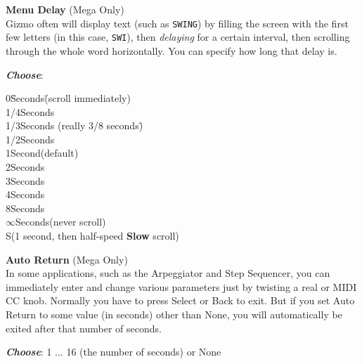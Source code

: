 \documentclass{article}
\begin{document}
\begin{description}
		
	\item{\bf  Menu Delay} (Mega Only)\\
		Gizmo often will display text (such as \texttt{SWING}) by filling the screen with the first few letters (in this case, \texttt{SWI}), then {\it delaying} for a certain interval, then scrolling through the whole word horizontally. You can specify how long that delay is.
	
		
		\begin{description}
			\item{\bf \textit{Choose}}:
			\begin{tabbing}
			0\hspace{2em}\=Seconds\hspace{0.5in}\=(scroll immediately)\\
			1/4\>Seconds\\
			1/3\>Seconds \>(really 3/8 seconds)\hspace{1in}\=\\
			1/2\>Seconds\\
			1\>Second\>(default)\\
			2\>Seconds\\
			3\>Seconds\\
			4\>Seconds\\
			8\>Seconds\\
			\(\infty\)\>Seconds\>(never scroll)\>\\
			S\>\>(1 second, then half-speed {\bf Slow} scroll)
			\end{tabbing}
		\end{description}

	\item{\bf  Auto Return} (Mega Only)\\
		In some applications, such as the Arpeggiator and Step Sequencer, you can immediately enter and change various parameters just by twisting a real or MIDI CC knob.  Normally you have to press Select or Back to exit.  But if you set Auto Return to some value (in seconds) other than None, you will automatically be exited after that number of seconds.

			\begin{description}
					\item{\bf \textit{Choose}}: 1 ... 16 (the number of seconds) or None\hspace{1.45in}\smash{\texttt{[image: none.pdf]}}
			\end{description}


\end{description}
\end{document}
